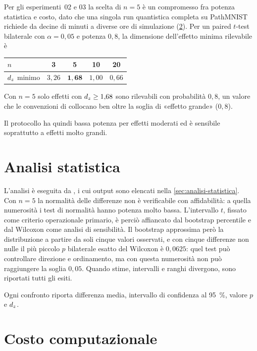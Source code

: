 Per gli esperimenti~02 e 03 la scelta di $n = 5$ è un compromesso fra potenza
statistica e costo, dato che una singola run quantistica completa su PathMNIST
richiede da decine di minuti a diverse ore di simulazione (\cref{sec:costo}). Per
un paired $t$-test bilaterale con
$\alpha = 0{,}05$ e potenza $0{,}8$, la dimensione dell'effetto minima rilevabile
è

\begin{center}
\begin{tabular}{@{}lcccc@{}}
\toprule
$n$ & 3 & 5 & 10 & 20 \\
\midrule
$d_z$ minimo & $3{,}26$ & $\mathbf{1{,}68}$ & $1{,}00$ & $0{,}66$ \\
\bottomrule
\end{tabular}
\end{center}

Con $n = 5$ solo effetti con $d_z \ge 1{,}68$ sono rilevabili con probabilità
$0{,}8$, un valore che le convenzioni di \textcite{cohen1988statistical}
collocano ben oltre la soglia di «effetto grande» ($0{,}8$).

Il protocollo ha quindi bassa potenza per effetti moderati ed è sensibile
soprattutto a effetti molto grandi.

\section{Analisi statistica}
\label{sec:statistica}

L'analisi è eseguita da , i cui output sono elencati
nella \cref{sec:analisi-statistica}. Con $n = 5$ la normalità delle differenze
non è verificabile con affidabilità: a quella numerosità i test di normalità hanno
potenza molto bassa. L'intervallo $t$, fissato come criterio
operazionale primario, è perciò affiancato dal bootstrap percentile e dal Wilcoxon
come analisi di sensibilità. Il bootstrap approssima però la distribuzione a
partire da soli cinque valori osservati, e con cinque differenze non nulle il più
piccolo $p$ bilaterale
esatto del Wilcoxon è $0{,}0625$: quel test può controllare direzione e
ordinamento, ma con questa numerosità non può raggiungere la soglia $0{,}05$. Quando
stime, intervalli e ranghi divergono, sono riportati tutti gli esiti.

Ogni confronto riporta differenza media, intervallo di confidenza al
\SI{95}{\percent}, valore $p$ e $d_z$.

\section{Costo computazionale}
\label{sec:costo}

